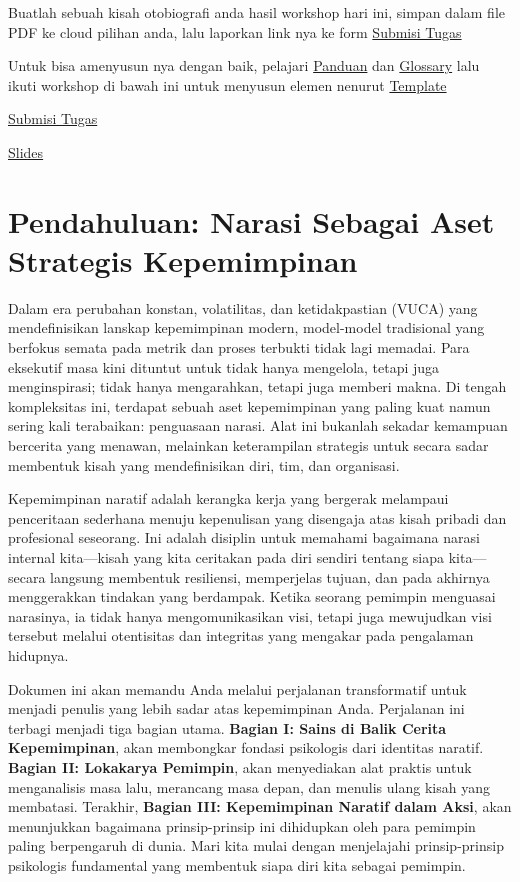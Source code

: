 \documentclass[
  letterpaper,
  DIV=11,
  numbers=noendperiod]{scrreprt}
\begin{document}
Buatlah sebuah kisah otobiografi anda hasil workshop hari ini, simpan
dalam file PDF ke cloud pilihan anda, lalu laporkan link nya ke form
\href{https://forms.office.com/r/mZL0Fdc5Cd}{Submisi Tugas}

Untuk bisa amenyusun nya dengan baik, pelajari \href{k-13a.pdf}{Panduan}
dan \href{k-13b.pdf}{Glossary} lalu ikuti workshop di bawah ini untuk
menyusun elemen nenurut \href{MyStoryWorkshop.docx}{Template}

\href{https://forms.office.com/r/mZL0Fdc5Cd}{Submisi Tugas}

\href{../slides/Penulis_Diri.pdf}{Slides}

\section{Pendahuluan: Narasi Sebagai Aset Strategis
Kepemimpinan}\label{pendahuluan-narasi-sebagai-aset-strategis-kepemimpinan}

Dalam era perubahan konstan, volatilitas, dan ketidakpastian (VUCA) yang
mendefinisikan lanskap kepemimpinan modern, model-model tradisional yang
berfokus semata pada metrik dan proses terbukti tidak lagi memadai. Para
eksekutif masa kini dituntut untuk tidak hanya mengelola, tetapi juga
menginspirasi; tidak hanya mengarahkan, tetapi juga memberi makna. Di
tengah kompleksitas ini, terdapat sebuah aset kepemimpinan yang paling
kuat namun sering kali terabaikan: penguasaan narasi. Alat ini bukanlah
sekadar kemampuan bercerita yang menawan, melainkan keterampilan
strategis untuk secara sadar membentuk kisah yang mendefinisikan diri,
tim, dan organisasi.

Kepemimpinan naratif adalah kerangka kerja yang bergerak melampaui
penceritaan sederhana menuju kepenulisan yang disengaja atas kisah
pribadi dan profesional seseorang. Ini adalah disiplin untuk memahami
bagaimana narasi internal kita---kisah yang kita ceritakan pada diri
sendiri tentang siapa kita---secara langsung membentuk resiliensi,
memperjelas tujuan, dan pada akhirnya menggerakkan tindakan yang
berdampak. Ketika seorang pemimpin menguasai narasinya, ia tidak hanya
mengomunikasikan visi, tetapi juga mewujudkan visi tersebut melalui
otentisitas dan integritas yang mengakar pada pengalaman hidupnya.

Dokumen ini akan memandu Anda melalui perjalanan transformatif untuk
menjadi penulis yang lebih sadar atas kepemimpinan Anda. Perjalanan ini
terbagi menjadi tiga bagian utama. \textbf{Bagian I: Sains di Balik
Cerita Kepemimpinan}, akan membongkar fondasi psikologis dari identitas
naratif. \textbf{Bagian II: Lokakarya Pemimpin}, akan menyediakan alat
praktis untuk menganalisis masa lalu, merancang masa depan, dan menulis
ulang kisah yang membatasi. Terakhir, \textbf{Bagian III: Kepemimpinan
Naratif dalam Aksi}, akan menunjukkan bagaimana prinsip-prinsip ini
dihidupkan oleh para pemimpin paling berpengaruh di dunia. Mari kita
mulai dengan menjelajahi prinsip-prinsip psikologis fundamental yang
membentuk siapa diri kita sebagai pemimpin.
\end{document}
